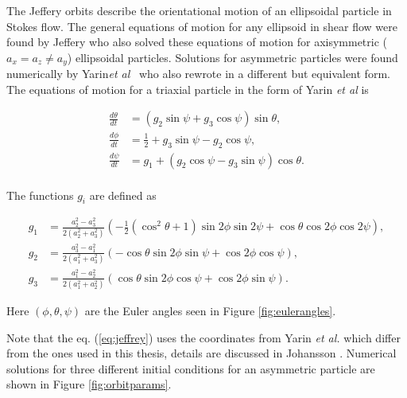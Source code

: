 \label{sec:jeffery}
The Jeffery orbits describe the orientational motion of an ellipsoidal particle in Stokes flow. The general equations of motion for any ellipsoid in shear flow were found by Jeffery\cite{Jeffery} who also solved these equations of motion for axisymmetric ($a_x = a_z \ne a_y$) ellipsoidal particles. Solutions for asymmetric particles were found numerically by Yarin\emph{et al}~\cite{Yarin} who also rewrote in a different but equivalent form. The equations of motion for a triaxial particle in the form of Yarin \emph{et al} is

\begin{subequations}\label{eq:jeffrey}
\begin{align}
\frac{d\theta}{dt} 	&= (g_2 \sin \psi + g_3 \cos \psi ) \sin \theta, \\
\frac{d\phi}{dt} 	&= \tfrac{1}{2} + g_3\sin \psi - g_2 \cos \psi,\\
\frac{d\psi}{dt}	&= g_1 + (g_2\cos \psi - g_3\sin \psi) \cos \theta. \\
\end{align}
\end{subequations}

\noindent The functions  $g_i$ are defined as

\begin{subequations}
\begin{align}
g_1 &= \frac{a_2^2 - a_3^2}{2(a_2^2 + a_3^2)} 
		\left(-\tfrac{1}{2}(\cos^2 \theta + 1 )\sin 2\phi \sin 2\psi + \cos\theta \cos 2\phi \cos 2\psi \right), \\
g_2 &= \frac{a_3^2 - a_1^2}{2(a_1^2 + a_3^2)}
		\left( -\cos\theta \sin 2\phi \sin\psi  +  \cos 2\phi \cos\psi \right), \\
g_3 &= \frac{a_1^2 - a_2^2}{2(a_1^2 + a_2^2)}
		\left( \cos\theta \sin 2\phi \cos\psi + \cos 2\phi \sin\psi \right).
\end{align}
\end{subequations}

Here $(\phi, \theta, \psi)$ are the Euler angles seen in Figure \ref{fig:eulerangles}. 

Note that the eq. (\ref{eq:jeffrey}) uses the coordinates from Yarin \emph{et al.}\cite{Yarin} which differ from the ones used in this thesis, details are discussed in Johansson \cite{AntonThesis}. Numerical solutions for three different initial conditions for an asymmetric particle are shown in Figure \ref{fig:orbitparams}.

